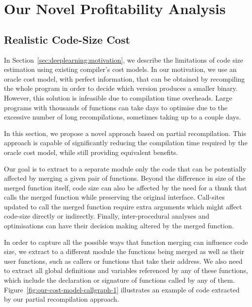 
\section{Our Novel Profitability Analysis}

\subsection{Realistic Code-Size Cost}

In Section~\ref{sec:deeplearning:motivation}, we describe the limitations of code size estimation using existing compiler's cost models.
In our motivation, we use an oracle cost model, with perfect information, that can be obtained by recompiling the whole program in order to decide which version produces a smaller binary.
However, this solution is infeasible due to compilation time overheads.
Large programs with thousands of functions can take days to optimise due to the excessive number of long recompilations, sometimes taking up to a couple days.

In this section, we propose a novel approach based on partial recompilation.
This approach is capable of significantly reducing the compilation time required by the oracle cost model, while still providing equivalent benefits.

Our goal is to extract to a separate module only the code that can be potentially affected by merging a given pair of functions.
Beyond the difference in size of the merged function itself, code size can also be affected by the need for a thunk that calls the merged function while preserving the original interface.
Call-sites updated to call the merged function require extra arguments which might affect code-size directly or indirectly. %
Finally, inter-procedural analyses and optimisations can have their decision making altered by the merged function.

In order to capture all the possible ways that function merging can influence code size, we extract to a different module the functions being merged as well as their user functions, such as callers or functions that take their address.
We also need to extract all global definitions and variables referenced by any of these functions, which include the declaration or signature of functions called by any of them.
Figure~\ref{fig:our-cost-model-callgraph-1} illustrates an example of code extracted by our partial recompilation approach.

